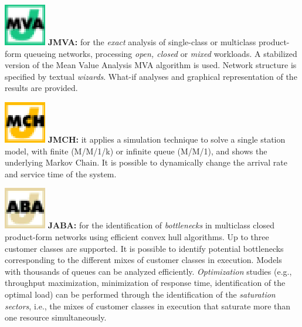 \medskip \noindent \includegraphics[scale=.5]{img/JMVAIcon}
\textbf{JMVA:} for the \emph{exact} analysis of single-class or
multiclass product-form queueing networks, processing \emph{open,
closed} or \emph{mixed} workloads. A stabilized version of the
Mean Value Analysis MVA algorithm is used. Network structure is
specified by textual \emph{wizards}. What-if analyses and
graphical representation of the results are provided.

\medskip \noindent \includegraphics[scale=.5]{img/JMCHIcon}
\textbf{JMCH:} it applies a simulation technique to solve a single
station model, with finite (M/M/1/k) or infinite queue (M/M/1),
and shows the underlying Markov Chain. It is possible to
dynamically change the arrival rate and service time of the
system.

\medskip \noindent \includegraphics[scale=.5]{img/JABAIcon}
\textbf{JABA:} for the identification of \emph{bottlenecks} in
multiclass closed product-form networks using efficient convex
hull algorithms. Up to three customer classes are supported. It is
possible to identify potential bottlenecks corresponding to the
different mixes of customer classes in execution. Models with
thousands of queues can be analyzed efficiently.
\emph{Optimization} studies (e.g., throughput maximization,
minimization of response time, identification of the optimal load)
can be performed through the identification of the
\emph{saturation sectors}, i.e., the mixes of customer classes in
execution that saturate more than one resource simultaneously.

